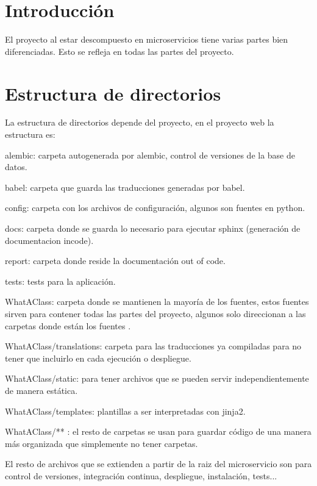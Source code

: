
\section{Introducción}

El proyecto al estar descompuesto en microservicios tiene varias partes bien diferenciadas. Esto se refleja en todas las partes del proyecto. 

\section{Estructura de directorios}

La estructura de directorios depende del proyecto, en el proyecto web la estructura es:
\begin{list}{-}{}
\item alembic: carpeta autogenerada por alembic, control de versiones de la base de datos.
\item babel: carpeta que guarda las traducciones generadas por babel.
\item config: carpeta con los archivos de configuración, algunos son fuentes en python.
\item docs: carpeta donde se guarda lo necesario para ejecutar sphinx (generación de documentacion incode).
\item report: carpeta donde reside la documentación out of code.
\item tests: tests para la aplicación.
\item WhatAClass: carpeta donde se mantienen la mayoría de los fuentes, estos fuentes sirven para contener todas las partes del proyecto, algunos solo direccionan a las carpetas donde están los fuentes .
\item WhatAClass/translations: carpeta para las traducciones ya compiladas para no tener que incluirlo en cada ejecución o despliegue.
\item WhatAClass/static: para tener archivos que se pueden servir independientemente de manera estática.
\item WhatAClass/templates: plantillas a ser interpretadas con jinja2.
\item WhatAClass/** : el resto de carpetas se usan para guardar código de una manera más organizada que simplemente no tener carpetas.
\item El resto de archivos que se extienden a partir de la raiz del microservicio son para control de versiones, integración continua, despliegue, instalación, tests...

\end{list}
